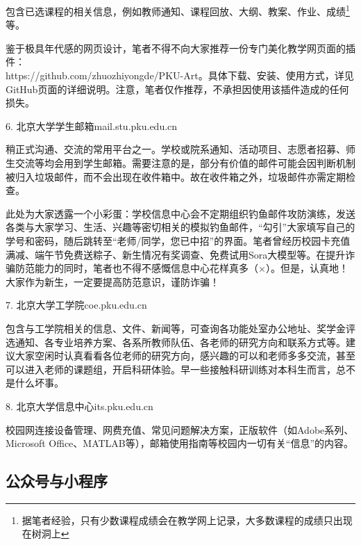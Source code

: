 \documentclass[11pt,oneside]{book}
\begin{document}
包含已选课程的相关信息，例如教师通知、课程回放、大纲、教案、作业、成绩\footnote{据笔者经验，只有少数课程成绩会在教学网上记录，大多数课程的成绩只出现在树洞上}等。

鉴于极具年代感的网页设计，笔者不得不向大家推荐一份专门美化教学网页面的插件：\\https://github.com/zhuozhiyongde/PKU-Art。具体下载、安装、使用方式，详见GitHub页面的详细说明。注意，笔者仅作推荐，不承担因使用该插件造成的任何损失。

\vspace{20pt}

6. 北京大学学生邮箱\quad mail.stu.pku.edu.cn 

稍正式沟通、交流的常用平台之一。学校或院系通知、活动项目、志愿者招募、师生交流等均会用到学生邮箱。需要注意的是，部分有价值的邮件可能会因判断机制被归入垃圾邮件，而不会出现在收件箱中。故在收件箱之外，垃圾邮件亦需定期检查。

此处为大家透露一个小彩蛋：学校信息中心会不定期组织钓鱼邮件攻防演练，发送各类与大家学习、生活、兴趣等密切相关的模拟钓鱼邮件，“勾引”大家填写自己的学号和密码，随后跳转至“老师/同学，您已中招”的界面。笔者曾经历校园卡充值满减、端午节免费送粽子、新生情况有奖调查、免费试用Sora大模型等。在提升诈骗防范能力的同时，笔者也不得不感慨信息中心花样真多（$\times$）。但是，认真地！大家作为新生，一定要提高防范意识，谨防诈骗！

\vspace{20pt}

7. 北京大学工学院\quad coe.pku.edu.cn

包含与工学院相关的信息、文件、新闻等，可查询各功能处室办公地址、奖学金评选通知、各专业培养方案、各系所教师队伍、各老师的研究方向和联系方式等。建议大家空闲时认真看看各位老师的研究方向，感兴趣的可以和老师多多交流，甚至可以进入老师的课题组，开启科研体验。早一些接触科研训练对本科生而言，总不是什么坏事。

\vspace{20pt}

8. 北京大学信息中心\quad its.pku.edu.cn

校园网连接设备管理、网费充值、常见问题解决方案，正版软件（如Adobe系列、Microsoft Office、MATLAB等），邮箱使用指南等校园内一切有关“信息”的内容。

\newpage

\subsection{公众号与小程序}
\end{document}
